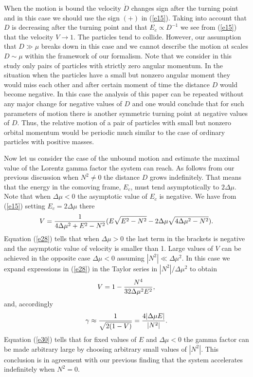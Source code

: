 \documentclass[aip,nofootinbib]{revtex4}
\begin{document}
When the motion is bound the velocity $\dot D$ changes sign after
the turning point and in this case we should use the sign $(+)$ in
(\ref{e15}). Taking into account that $D$ is decreasing after the
turning point and that $E_{c} \propto D^{-1}$ we see from
(\ref{e15}) that the velocity $V\rightarrow 1$. The particles tend
to collide. However, our assumption that $D \gg \mu $ breaks down
in this case and we cannot describe the motion at scales $D\sim
\mu $ within the framework of our formalism. Note that we consider
in this study only pairs of particles with strictly zero angular
momentum. In the situation when the particles have a small but
nonzero angular moment they would miss each other and after
certain moment of time the distance $D$ would become negative. In
this case the analysis of this paper can be repeated without any
major change for negative values of $D$ and one would conclude
that for such parameters of motion there is another symmetric
turning point at negative values of $D$. Thus, the relative motion
of a pair of particles with small but nonzero orbital momentum
would be periodic much similar to the case of ordinary particles
with positive masses.

Now let us consider the case of the unbound motion and estimate
the maximal value of the Lorentz gamma factor the system can
reach. As follows from our previous discussion when $N^2\ne 0$ the
distance $D$ grows indefinitely. That means that the energy in the
comoving frame, $E_{c}$, must tend asymptotically to $2\Delta
\mu$. Note that when $\Delta \mu < 0$ the asymptotic value of
$E_c$ is negative. We have from (\ref{e15}) setting $E_{c}=2\Delta
\mu $ there
\begin{equation}
V={1\over 4\Delta \mu^2+E^{2}-N^2}(E\sqrt{E^2-N^2}-2\Delta \mu
\sqrt {4\Delta \mu^2 -N^2}).
\label{e28}
\end{equation}
Equation (\ref{e28}) tells that when $\Delta \mu > 0$ the last
term in the brackets is negative and the asymptotic value of
velocity is smaller than 1. Large values of $V$ can be achieved in
the opposite  case $\Delta \mu < 0$ assuming $|N^2| \ll \Delta
\mu^2 $. In this case we expand expressions in  (\ref{e28}) in the
Taylor series in $|N^2|/\Delta \mu^2 $ to obtain
\begin{equation}
V=1-{N^{4}\over 32\Delta \mu^2 E^2}, \label{e29}
\end{equation}
and, accordingly
\begin{equation}
\gamma\approx {1\over \sqrt{2(1-V)}}={4|\Delta \mu E|\over |N^2|}.
\label{e30}
\end{equation}
Equation (\ref{e30}) tells that for fixed values of $E$ and
$\Delta \mu < 0$ the gamma factor can be made arbitrary large by
choosing arbitrary small values of $|N^{2}|$. This conclusion is
in agreement with our previous finding that the system accelerates
indefinitely when $N^2=0$.
\end{document}
